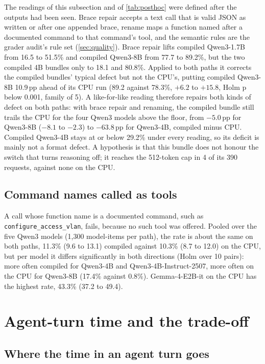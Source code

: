 \documentclass[11pt]{article}
\begin{document}
The readings of this subsection and of \cref{tab:posthoc} were defined after the outputs had been seen. Brace repair accepts a text call that is valid JSON as written or after one appended brace, rename maps a function named after a documented command to that command's tool, and the semantic rules are the grader audit's rule set (\cref{sec:quality}). Brace repair lifts compiled Qwen3-1.7B from 16.5 to 51.5\% and compiled Qwen3-8B from 77.7 to 89.2\%, but the two compiled 4B bundles only to 18.1 and 80.8\%. Applied to both paths it corrects the compiled bundles' typical defect but not the CPU's, putting compiled Qwen3-8B 10.9\,pp ahead of its CPU run (89.2 against 78.3\%, $+6.2$ to $+15.8$, Holm p below 0.001, family of 5). A like-for-like reading therefore repairs both kinds of defect on both paths: with brace repair and renaming, the compiled bundle still trails the CPU for the four Qwen3 models above the floor, from $-5.0$\,pp for Qwen3-8B ($-8.1$ to $-2.3$) to $-63.8$\,pp for Qwen3-4B, compiled minus CPU. Compiled Qwen3-4B stays at or below 29.2\% under every reading, so its deficit is mainly not a format defect. A hypothesis is that this bundle does not honour the switch that turns reasoning off; it reaches the 512-token cap in 4 of its 390 requests, against none on the CPU.

\subsection{Command names called as tools}\label{sec:cmdnames}

A call whose function name is a documented command, such as \texttt{configure\_access\_vlan}, fails, because no such tool was offered. Pooled over the five Qwen3 models (1,300 model-items per path), the rate is about the same on both paths, 11.3\% (9.6 to 13.1) compiled against 10.3\% (8.7 to 12.0) on the CPU, but per model it differs significantly in both directions (Holm over 10 pairs): more often compiled for Qwen3-4B and Qwen3-4B-Instruct-2507, more often on the CPU for Qwen3-8B (17.4\% against 0.8\%). Gemma-4-E2B-it on the CPU has the highest rate, 43.3\% (37.2 to 49.4).

\section{Agent-turn time and the trade-off}\label{sec:time}

\subsection{Where the time in an agent turn goes}\label{sec:turn}
\end{document}
